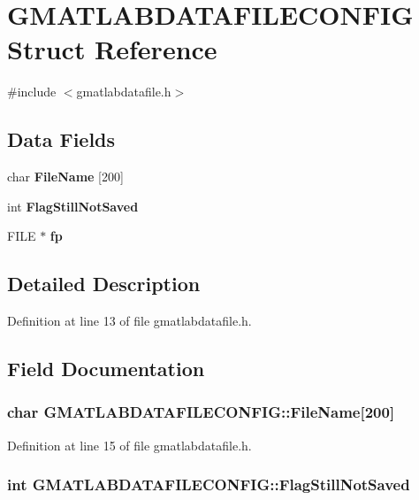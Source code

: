 \section{GMATLABDATAFILECONFIG Struct Reference}
\label{structGMATLABDATAFILECONFIG}


{\ttfamily \#include $<$gmatlabdatafile.h$>$}\subsection*{Data Fields}
\begin{DoxyCompactItemize}
\item 
char {\bf FileName} [200]
\item 
int {\bf FlagStillNotSaved}
\item 
FILE $\ast$ {\bf fp}
\end{DoxyCompactItemize}


\subsection{Detailed Description}


Definition at line 13 of file gmatlabdatafile.h.

\subsection{Field Documentation}
\subsubsection[{FileName}]{\setlength{\rightskip}{0pt plus 5cm}char {\bf GMATLABDATAFILECONFIG::FileName}[200]}\label{structGMATLABDATAFILECONFIG_ada4eb3a8fbcfdcb41723f31d09e0bd19}


Definition at line 15 of file gmatlabdatafile.h.
\subsubsection[{FlagStillNotSaved}]{\setlength{\rightskip}{0pt plus 5cm}int {\bf GMATLABDATAFILECONFIG::FlagStillNotSaved}}\label{structGMATLABDATAFILECONFIG_a58d1c2a70b22c7c08eccaaea77990db2}


